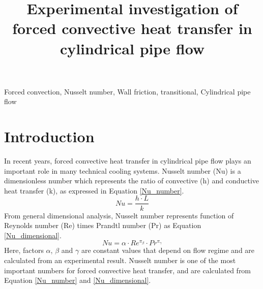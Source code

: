\documentclass[conference]{IEEEtran}
\begin{document}
\title{Experimental investigation of forced convective heat transfer in cylindrical pipe flow\\
}

\author{
}

\maketitle


\begin{IEEEkeywords}
Forced convection, Nusselt number, Wall friction, transitional, Cylindrical pipe flow
\end{IEEEkeywords}

\section{Introduction}
In recent years, forced convective heat transfer in cylindrical pipe flow plays an important role in many technical cooling systems.
Nusselt number (Nu) is a dimensionless number which represents the ratio of convective (h) and conductive heat transfer (k), as expressed in Equation \eqref{Nu_number}.
\begin{equation}
Nu=\frac{h\cdot L}{k}\label{Nu_number}
\end{equation}
From general dimensional analysis, Nusselt number represents function of Reynolds number (Re) times Prandtl number (Pr) as Equation \eqref{Nu_dimensional}.
\begin{equation}
Nu=\alpha \cdot Re^{\pi_{\beta}}\cdot Pr^{\pi_{\gamma}}\label{Nu_dimensional}
\end{equation}
Here, factors $\alpha$, $\beta$ and $\gamma$ are constant values that depend on flow regime and are calculated from an experimental result.
Nusselt number is one of the most important numbers for forced convective heat transfer, and are calculated from Equation \eqref{Nu_number} and \eqref{Nu_dimensional}.
\end{document}
